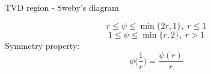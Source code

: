 \documentclass{beamer}
\begin{document}
\begin{frame}{TVD region - Sweby's diagram}
\begin{minipage}[t]{0.63\textwidth}
\begin{figure}
	\centering
	\hspace{-1.24cm}
	
\end{figure}
\end{minipage}
\begin{minipage}[t]{0.35\textwidth}
	\vspace{1cm}
\begin{equation*}
	r \leq \psi \leq \min \{2r, 1\}, \; r\leq1
\end{equation*}
\begin{equation*}
	1 \leq \psi \leq \min \{r, 2\}, \; r>1
\end{equation*}
\centering
	Symmetry property:
	\begin{equation*}
	\psi\bigg(\frac{1}{r}\bigg) = \frac{\psi(r)}{r}
	\end{equation*}
\end{minipage}
\end{frame}
\end{document}
